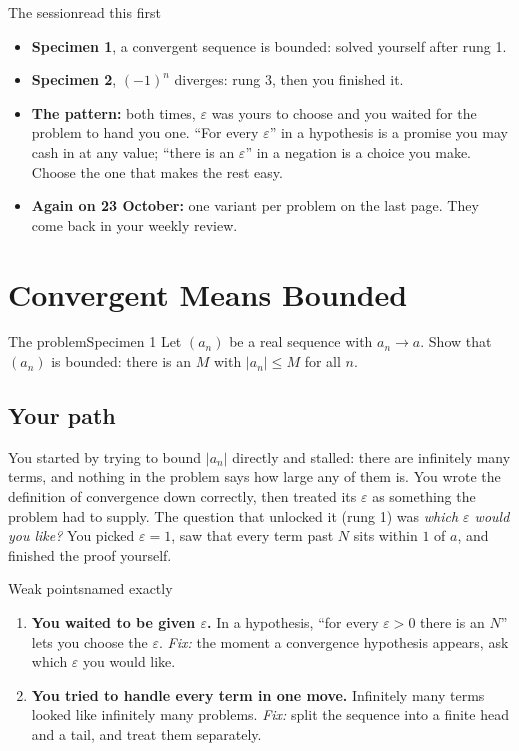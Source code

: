 \documentclass{kaelearn}
\subtitle{Two problems, one blind spot: who chooses $\varepsilon$.}
\begin{document}
\makeheader
{}

\begin{panel}{The session}{read this first}{}
\begin{itemize}
  \item \textbf{Specimen 1}, a convergent sequence is bounded: solved yourself after rung 1.
  \item \textbf{Specimen 2}, $(-1)^n$ diverges: rung 3, then you finished it.
  \item \textbf{The pattern:} both times, $\varepsilon$ was yours to choose and you waited for the
        problem to hand you one. ``For every $\varepsilon$'' in a hypothesis is a promise you may
        cash in at any value; ``there is an $\varepsilon$'' in a negation is a choice you make.
        Choose the one that makes the rest easy.
  \item \textbf{Again on 23 October:} one variant per problem on the last page. They come back in
        your weekly review.
\end{itemize}
\end{panel}

\section{Convergent Means Bounded}

\begin{panel}[unbreakable]{The problem}{Specimen 1}{}
Let $(a_n)$ be a real sequence with $a_n\to a$. Show that $(a_n)$ is bounded: there is an $M$ with
$|a_n|\le M$ for all $n$.
\end{panel}

\subsection{Your path}
You started by trying to bound $|a_n|$ directly and stalled: there are infinitely many terms, and
nothing in the problem says how large any of them is. You wrote the definition of convergence down
correctly, then treated its $\varepsilon$ as something the problem had to supply. The question that
unlocked it (rung 1) was \emph{which $\varepsilon$ would you like?} You picked $\varepsilon=1$, saw
that every term past $N$ sits within $1$ of $a$, and finished the proof yourself.

\begin{panel}[unbreakable]{Weak points}{named exactly}{}
\begin{enumerate}
  \item \textbf{You waited to be given $\varepsilon$.} In a hypothesis, ``for every $\varepsilon>0$
        there is an $N$'' lets you choose the $\varepsilon$. \emph{Fix:} the moment a convergence
        hypothesis appears, ask which $\varepsilon$ you would like.
  \item \textbf{You tried to handle every term in one move.} Infinitely many terms looked like
        infinitely many problems. \emph{Fix:} split the sequence into a finite head and a tail,
        and treat them separately.
\end{enumerate}
\end{panel}
\end{document}
